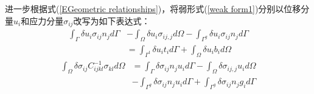 进一步根据式(\ref{EGeometric relationships})，将弱形式(\ref{weak form1})分别以位移分量$u_i$和应力分量$\sigma_{ij}$改写为如下表达式：
\begin{equation}\label{deltau}
\begin{split}
    \int_{\Gamma}\delta u_i\sigma_{ij}n_jd\Gamma&-\int_{\Omega}\delta u_i\sigma_{ij,j}d\Omega-\int_{\Gamma^g}\delta u_i\sigma_{ij}n_jd\Gamma\\
    &=\int_{\Gamma^t}\delta u_it_id\Gamma+\int_{\Omega}\delta u_ib_id\Omega
\end{split}
\end{equation} 
\begin{equation}\label{deltasigma}
\begin{split}
    \int_{\Omega}\delta\sigma_{ij}C^{-1}_{ijkl}\sigma_{kl}d\Omega&=\int_{\Gamma}\delta\sigma_{ij}n_ju_id\Gamma-\int_{\Omega}\delta\sigma_{ij,j}u_id\Omega\\
    &-\int_{\Gamma^g}\delta\sigma_{ij}n_ju_id\Gamma+\int_{\Gamma^g}\delta\sigma_{ij}n_jg_id\Gamma
\end{split}
\end{equation}    
